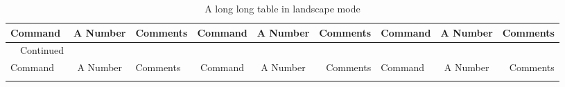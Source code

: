 \begin{SingleSpace}
\begin{longtable}{>{\ttfamily}m{}m{}m{}}
		\bottomrule
	\end{longtable}
\end{SingleSpace}

\lipsum[4]

\begin{landscape}
	\SingleSpacing

	\begin{longtable}{p{5em}clccrlcr}
		\caption{A long long table in landscape mode}
		\label{tab:landscapelong}\\
		
		\toprule
		Command                    & A Number & Comments         & Command                    & A Number & Comments         & Command                    & A Number & Comments         \\
		\midrule
		
		\endfirsthead
		
		\normalfont\tablename~\thetable{}~Continued\\
		\toprule
		Command                    & A Number & Comments         & Command                    & A Number & Comments         & Command                    & A Number & Comments         \\
		\midrule
		
		\endhead
		
		\bottomrule		
		\endfoot
		
		\endlastfoot
		

\end{longtable}
\end{landscape}

